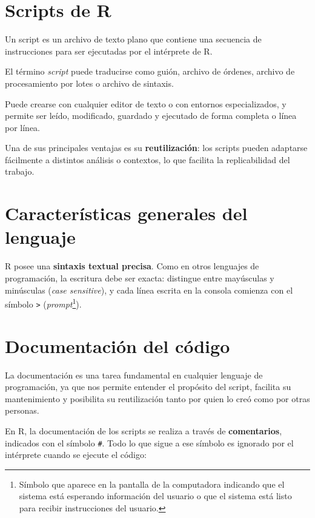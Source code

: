 \documentclass[
  spanish,
  a4paper,
]{scrbook}
\begin{document}
\section{Scripts de R}\label{scripts-de-r}

Un script es un archivo de texto plano que contiene una secuencia de
instrucciones para ser ejecutadas por el intérprete de R.

El término \emph{script} puede traducirse como guión, archivo de
órdenes, archivo de procesamiento por lotes o archivo de sintaxis.

Puede crearse con cualquier editor de texto o con entornos
especializados, y permite ser leído, modificado, guardado y ejecutado de
forma completa o línea por línea.

Una de sus principales ventajas es su \textbf{reutilización}: los
scripts pueden adaptarse fácilmente a distintos análisis o contextos, lo
que facilita la replicabilidad del trabajo.

\section{Características generales del
lenguaje}\label{caracteruxedsticas-generales-del-lenguaje}

R posee una \textbf{sintaxis textual precisa}. Como en otros lenguajes
de programación, la escritura debe ser exacta: distingue entre
mayúsculas y minúsculas (\emph{case sensitive}), y cada línea escrita en
la consola comienza con el símbolo \texttt{\textgreater{}}
(\emph{prompt}\footnote{Símbolo que aparece en la pantalla de la
  computadora indicando que el sistema está esperando información del
  usuario o que el sistema está listo para recibir instrucciones del
  usuario.}).

\section{Documentación del código}\label{documentaciuxf3n-del-cuxf3digo}

La documentación es una tarea fundamental en cualquier lenguaje de
programación, ya que nos permite entender el propósito del script,
facilita su mantenimiento y posibilita su reutilización tanto por quien
lo creó como por otras personas.

En R, la documentación de los scripts se realiza a través de
\textbf{comentarios}, indicados con el símbolo \texttt{\#}. Todo lo que
sigue a ese símbolo es ignorado por el intérprete cuando se ejecute el
código:
\end{document}

